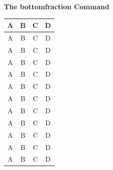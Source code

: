 \documentclass{article}
\begin{document}
	{\centering\Huge\bf The bottomfraction Command}
	
	\begin{table}[b]
		\begin{tabular}{|*{4}{c|}}
			\hline A & B & C & D \\ \hline
			\hline A & B & C & D \\ \hline
			\hline A & B & C & D \\ \hline
			\hline A & B & C & D \\ \hline
			\hline A & B & C & D \\ \hline
			\hline A & B & C & D \\ \hline
			\hline A & B & C & D \\ \hline
			\hline A & B & C & D \\ \hline
			\hline A & B & C & D \\ \hline
			\hline A & B & C & D \\ \hline
			\hline A & B & C & D \\ \hline
			\hline A & B & C & D \\ \hline
		\end{tabular}
	\end{table}
	
\end{document}
